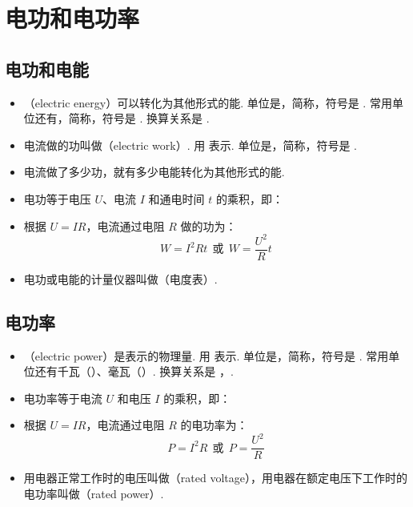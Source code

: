 \section{电功和电功率}

\subsection{电功和电能}
\begin{itemize}
\item {}（electric energy）可以转化为其他形式的能. 单位是，简称，符号是 . 常用单位还有，简称，符号是 . 换算关系是 .
\item 电流做的功叫做（electric work）. 用  表示. 单位是，简称，符号是 .
\item 电流做了多少功，就有多少电能转化为其他形式的能.
\item 电功等于电压 $U$、电流 $I$ 和通电时间 $t$ 的乘积，即：
\item 根据 $U=IR$，电流通过电阻 $R$ 做的功为：
$$
W=I^2Rt~~或~~W=\frac{U^2}Rt
$$
\item 电功或电能的计量仪器叫做（电度表）.
\end{itemize}

\subsection{电功率}
\begin{itemize}
\item {}（electric power）是表示的物理量. 用  表示. 单位是，简称，符号是 . 常用单位还有千瓦（）、毫瓦（）. 换算关系是 ，.
\item 电功率等于电流 $U$ 和电压 $I$ 的乘积，即：
\item 根据 $U=IR$，电流通过电阻 $R$ 的电功率为：
$$
P=I^2R~~或~~P=\frac{U^2}R
$$
\item 用电器正常工作时的电压叫做（rated voltage），用电器在额定电压下工作时的电功率叫做（rated power）.
\end{itemize}
